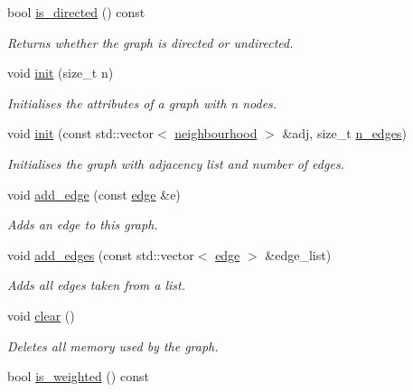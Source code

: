 \begin{DoxyCompactItemize}
bool \hyperlink{classlgraph_1_1uugraph_aacea191cad57939a30b06f833e75c6ef}{is\-\_\-directed} () const 
\begin{DoxyCompactList}\small\item\em Returns whether the graph is directed or undirected. \end{DoxyCompactList}\item 
void \hyperlink{classlgraph_1_1uxgraph_a539e735d68b55ce01d733262c9db34d5}{init} (size\-\_\-t n)
\begin{DoxyCompactList}\small\item\em Initialises the attributes of a graph with {\itshape n} nodes. \end{DoxyCompactList}\item 
void \hyperlink{classlgraph_1_1uxgraph_ab0e84975aa8048e6d93622d1b4e0c567}{init} (const std\-::vector$<$ \hyperlink{namespacelgraph_a052e7766c13f3a43cec0aec8173fdede}{neighbourhood} $>$ \&adj, size\-\_\-t \hyperlink{classlgraph_1_1xxgraph_a8ca991d1521cb6ba77e1cd3494ab42be}{n\-\_\-edges})
\begin{DoxyCompactList}\small\item\em Initialises the graph with adjacency list and number of edges. \end{DoxyCompactList}\item 
void \hyperlink{classlgraph_1_1uxgraph_a1a826ff50563bc4021e16d712f309232}{add\-\_\-edge} (const \hyperlink{namespacelgraph_a76bd7d50719f03de7a85db259d80d572}{edge} \&e)
\begin{DoxyCompactList}\small\item\em Adds an edge to this graph. \end{DoxyCompactList}\item 
void \hyperlink{classlgraph_1_1uxgraph_ad20f841d6bb1147d087546c6054c55f3}{add\-\_\-edges} (const std\-::vector$<$ \hyperlink{namespacelgraph_a76bd7d50719f03de7a85db259d80d572}{edge} $>$ \&edge\-\_\-list)
\begin{DoxyCompactList}\small\item\em Adds all edges taken from a list. \end{DoxyCompactList}\item 
void \hyperlink{classlgraph_1_1uxgraph_aad397c98fd1f144350e4418971319a97}{clear} ()
\begin{DoxyCompactList}\small\item\em Deletes all memory used by the graph. \end{DoxyCompactList}\item 
\hypertarget{classlgraph_1_1uxgraph_a08952515aec4a03dc9fbbfef5e5d35b8}{bool \hyperlink{classlgraph_1_1uxgraph_a08952515aec4a03dc9fbbfef5e5d35b8}{is\-\_\-weighted} () const }\label{classlgraph_1_1uxgraph_a08952515aec4a03dc9fbbfef5e5d35b8}


\end{DoxyCompactItemize}
